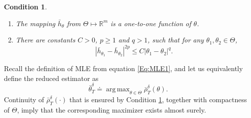 \documentclass{article}
\newtheorem{condition}{Condition}[section]
\DeclareMathOperator*{\argmax}{arg\,max}
\begin{document}
\begin{condition}\label{A:Assumption4}
\begin{enumerate}
\item The mapping $\bar h_\theta$ from $\Theta\mapsto \mathbb R^m$ is a one-to-one function of $\theta$.
\item
There are constants $C>0$, $p\geq 1$ and $q>1$, such that for any $\theta_{1},\theta_{2}\in\Theta$,
\[
|\bar{h}_{\theta_{1}}-\bar{h}_{\theta_{2}}|^{2p}\leq C|\theta_{1}-\theta_{2}|^{q}.
\]
\end{enumerate}
\end{condition}
Recall the definition of MLE from equation \eqref{Eq:MLE1}, and let us equivalently define the reduced estimator as
\begin{equation}
\bar{\theta}^{\delta}_{T}\doteq\argmax_{\theta\in\Theta}\bar{\rho}_T^\delta(\theta).\label{Eq:ThetaMLE}
\end{equation}
Continuity of $\bar{\rho}_T^\delta(\cdot)$ that is ensured by Condition \ref{A:Assumption4}, together with compactness of $\Theta$, imply that the corresponding maximizer exists almost surely.
\end{document}
